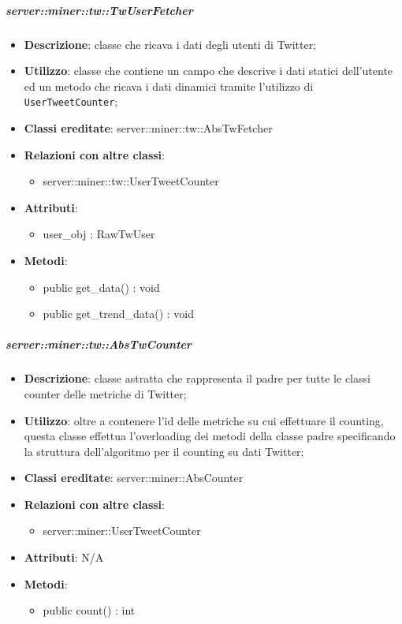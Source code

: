 	\subparagraph{server::miner::tw::TwUserFetcher} %
		\label{subp:server_miner_tw_TwUserFetcher}
			\begin{itemize}
				\item \textbf{Descrizione}: classe che ricava i dati degli utenti di Twitter;
				\item \textbf{Utilizzo}: classe che contiene un campo che descrive i dati statici dell'utente ed un metodo che ricava i dati dinamici tramite l'utilizzo di \texttt{UserTweetCounter};
				\item \textbf{Classi ereditate}: server::miner::tw::AbsTwFetcher
				\item \textbf{Relazioni con altre classi}:
					\begin{itemize}
						\item server::miner::tw::UserTweetCounter
					\end{itemize}
				\item \textbf{Attributi}:    
					\begin{itemize}
						\item user\_obj : RawTwUser
					\end{itemize}
				\item \textbf{Metodi}:  
					\begin{itemize}
						\item public get\_data() : void
						\item public get\_trend\_data() : void
					\end{itemize}
			\end{itemize}

	\subparagraph{server::miner::tw::AbsTwCounter} %
		\label{subp:server_miner_tw_AbsTwCounter}
			\begin{itemize}
				\item \textbf{Descrizione}: classe astratta che rappresenta il padre per tutte le classi counter delle metriche di Twitter;
				\item \textbf{Utilizzo}: oltre a contenere l’id delle metriche su cui effettuare il counting, questa classe effettua l'overloading dei metodi della classe padre specificando la struttura dell'algoritmo per il counting su dati Twitter;
				\item \textbf{Classi ereditate}: server::miner::AbsCounter
				\item \textbf{Relazioni con altre classi}:
					\begin{itemize}
						\item server::miner::UserTweetCounter
					\end{itemize}
				\item \textbf{Attributi}: N/A
				\item \textbf{Metodi}: 
					\begin{itemize}
						\item public count() : int
					\end{itemize}
			\end{itemize}

